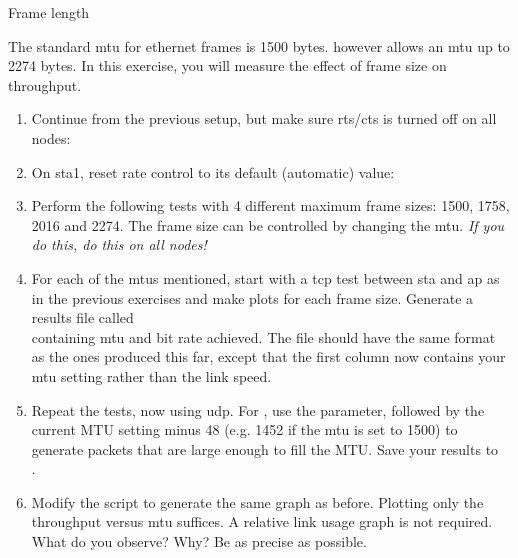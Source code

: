 \begin{exercise}{Frame length}

	The standard \ac{mtu} for ethernet frames is 1500 bytes. \wifi however allows an \ac{mtu} up to 2274 bytes. In this exercise, you will measure the effect of frame size on throughput.
	
	\begin{enumerate}
		\item Continue from the previous setup, but make sure \ac{rts}/\ac{cts} is turned off on all nodes:\newline
		\item On \ac{sta}1, reset rate control to its default (automatic) value:\newline
		\item Perform the following tests with 4 different maximum frame sizes: 1500, 1758, 2016 and 2274. The frame size can be controlled by changing the \ac{mtu}. \emph{If you do this, do this on all nodes!}\newline
		\item For each of the \acp{mtu} mentioned, start with a \ac{tcp}  test between \ac{sta} and \ac{ap} as in the previous exercises and make plots for each frame size. Generate a results file called \\ containing \ac{mtu} and bit rate achieved. The file should have the same format as the ones produced this far, except that the first column now contains your \ac{mtu} setting rather than the link speed.\newline
		\item Repeat the tests, now using \ac{udp}. For , use the   parameter, followed by the current MTU setting minus 48 (e.g. 1452 if the \ac{mtu} is set to 1500) to generate packets that are large enough to fill the MTU.  Save your results to \\.\newline
    		\item Modify the  script to generate the same graph as before. Plotting only the throughput versus \ac{mtu} suffices. A relative link usage graph is not required. What do you observe? Why? Be as precise as possible.\newline
		\begin{esolution}
		\end{esolution}	 
	\end{enumerate}
		
\end{exercise}


